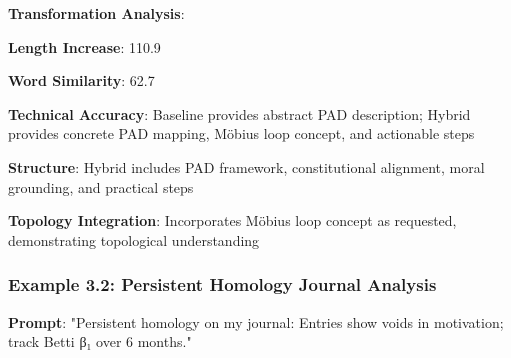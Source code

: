\documentclass[11pt,a4paper]{article}
\begin{document}
\textbf{Transformation Analysis}:
\item \textbf{Length Increase}: 110.9%
\item \textbf{Word Similarity}: 62.7%
\item \textbf{Technical Accuracy}: Baseline provides abstract PAD description; Hybrid provides concrete PAD mapping, Möbius loop concept, and actionable steps
\item \textbf{Structure}: Hybrid includes PAD framework, constitutional alignment, moral grounding, and practical steps
\item \textbf{Topology Integration}: Incorporates Möbius loop concept as requested, demonstrating topological understanding

\subsubsection{Example 3.2: Persistent Homology Journal Analysis}

\textbf{Prompt}: "Persistent homology on my journal: Entries show voids in motivation; track Betti β₁ over 6 months."
\end{document}
